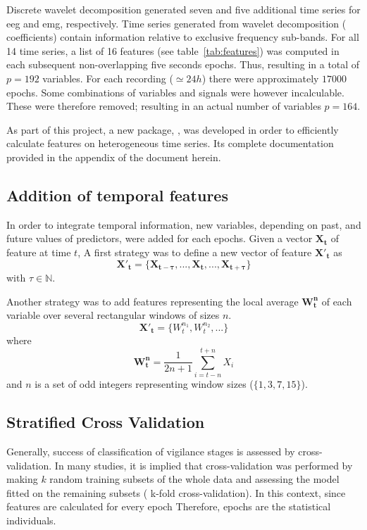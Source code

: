 Discrete wavelet decomposition generated seven and five additional time series for \gls{eeg} and \gls{emg}, respectively.
Time series generated from wavelet decomposition (\ie{} coefficients) contain information relative to exclusive frequency sub-bands.
For all 14 time series, a list of 16 features (see table~\ref{tab:features}) was computed in each subsequent non-overlapping five seconds epochs.
Thus, resulting in a total of $p=192$ variables. For each recording ($\simeq 24h$) there were approximately $17000$ epochs.
Some combinations of variables and signals were however incalculable.
These were therefore removed; resulting in an actual number of variables $p=164$.



As part of this project, a new \py{} package, \pr{}, was developed in order to efficiently
calculate features on heterogeneous time series.
Its complete documentation provided in the appendix of the document herein.

\subsection{Addition of temporal features}
In order to integrate temporal information, new variables, depending on past, and future values of predictors, were added for each epochs.
Given a vector $\mathbf{X_t}$ of feature at time $t$,
A first strategy was to define a new vector of feature $\mathbf{{X'}_t}$ as
\begin{equation}
\mathbf{{X'}_t} = \{\mathbf{X_{t-\tau}}, ..., \mathbf{X_t}, ..., \mathbf{X_{t+\tau}}\}
\label{eq:tau}
\end{equation}
with $\tau \in \mathbb{N}$.

Another strategy was to add features representing the local average $\mathbf{W^n_t}$ of each variable over several rectangular windows of sizes $n$.
\begin{equation}
\mathbf{{X'}_t} = \{W^{n_1}_t, W^{n_2}_t, ...\}
\label{eq:window}
\end{equation}
where
\[
\mathbf{W^n_t} = \frac{1}{2n+1} \sum_{i = t-n}^{t+n}{X_i}
\]
and $n$ is a set of odd integers representing window sizes (\eg $\{1,3,7,15\}$).



\subsection{Stratified Cross Validation}
Generally, success of classification of vigilance stages is assessed by cross-validation.
In many studies\citationneeded{}, it is implied that cross-validation was performed by making $k$ random training subsets
of the whole data and assessing the model fitted on the remaining subsets (\ie{} k-fold cross-validation). 
In this context, since features are calculated for every epoch
Therefore, epochs are the statistical individuals.

